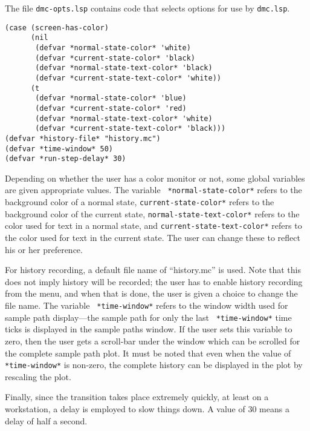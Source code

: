 The file {\tt dmc-opts.lsp} contains code that selects options for use
by {\tt dmc.lsp}. 
\begin{verbatim}
(case (screen-has-color)
      (nil
       (defvar *normal-state-color* 'white)
       (defvar *current-state-color* 'black)
       (defvar *normal-state-text-color* 'black)
       (defvar *current-state-text-color* 'white))
      (t 
       (defvar *normal-state-color* 'blue)
       (defvar *current-state-color* 'red)
       (defvar *normal-state-text-color* 'white)
       (defvar *current-state-text-color* 'black)))
(defvar *history-file* "history.mc")
(defvar *time-window* 50)
(defvar *run-step-delay* 30)
\end{verbatim}
Depending on whether the user has a color monitor or not, some global
variables are given appropriate values. The variable {\tt
  *normal-state-color*} refers to the background color of a normal
state, {\tt *current-state-color*} refers to the background color of
the current state, {\tt normal-state-text-color*} refers to the color
used for text in a normal state, and {\tt *current-state-text-color*}
refers to the color used for text in the current state.  The user can
change these to reflect his or her preference.  

For history recording, a default file name of ``history.mc'' is used.
Note that this does not imply history will be recorded; the user has
to enable history recording from the menu, and when that is done, the
user is given a choice to change the file name. The variable {\tt
  *time-window*} refers to the window width used for
sample path display---the sample path for only the last {\tt
  *time-window*} time ticks is displayed in the sample paths window.
If the user sets this variable to zero, then the user gets a
scroll-bar under the window which can be scrolled for the complete
sample path plot.  It must be noted that even when the value of {\tt
  *time-window*} is non-zero, the complete history can be displayed
in the plot by rescaling the plot. 

Finally, since the transition takes place extremely quickly, at least
on a workstation, a delay is employed to slow things down.  A value of
$30$ means a delay of half a second. 

